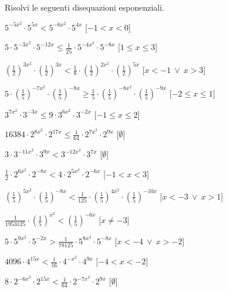 \begin{esercizio}\label{ese:}
 Risolvi le seguenti disequazioni esponenziali.
 \begin{enumeratea}
  \item  \(5^{{-5x^2}} \cdot 5^{{5x}} < 5^{{-6x^2}} \cdot 5^{{4x}}\)
   \hfill [\(-1 < x < 0\)]
  \item  \(5 \cdot 5^{{-3x^2}} \cdot 5^{{-12x}} \leqslant \frac{1}{25} \cdot 
5^{{-4x^2}} \cdot 5^{{-8x}}\)
   \hfill [\(1 \leqslant x \leqslant 3\)]
  \item  \(\left(\frac{1}{2}\right)^{{3x^2}} \cdot 
\left(\frac{1}{2}\right)^{{3x}} < \frac{1}{8} \cdot 
\left(\frac{1}{2}\right)^{{2x^2}} \cdot \left(\frac{1}{2}\right)^{{5x}}\)
   \hfill [\(x < -1~\vee~x > 3\)]
  \item  \(5 \cdot \left(\frac{1}{5}\right)^{{-7x^2}} \cdot 
\left(\frac{1}{5}\right)^{{-8x}} \geqslant \frac{1}{5} \cdot 
\left(\frac{1}{5}\right)^{{-8x^2}} \cdot \left(\frac{1}{5}\right)^{{-9x}}\)
   \hfill [\(-2 \leqslant x \leqslant 1\)]
  \item  \(3^{{7x^2}} \cdot 3^{{-3x}} \leqslant 9 \cdot 3^{{6x^2}} \cdot 
3^{{-2x}}\)
   \hfill [\(-1 \leqslant x \leqslant 2\)]
  \item  \(16384 \cdot 2^{{8x^2}} \cdot 2^{{17x}} \leqslant \frac{1}{64} \cdot 
2^{{7x^2}} \cdot 2^{{9x}}\)
   \hfill [\(\emptyset\)]
  \item  \(3 \cdot 3^{{-11x^2}} \cdot 3^{{9x}} < 3^{{-12x^2}} \cdot 3^{{7x}}\)
   \hfill [\(\emptyset\)]
  \item  \(\frac{1}{2} \cdot 2^{{6x^2}} \cdot 2^{{-8x}} < 4 \cdot 2^{{5x^2}} 
\cdot 2^{{-6x}}\)
   \hfill [\(-1 < x < 3\)]
  \item  \(\left(\frac{1}{5}\right)^{{5x^2}} \cdot 
\left(\frac{1}{5}\right)^{{-8x}} < \frac{1}{125} \cdot 
\left(\frac{1}{5}\right)^{{4x^2}} \cdot \left(\frac{1}{5}\right)^{{-10x}}\)
   \hfill [\(x < -3~\vee~x > 1\)]
  \item  \(\frac{1}{1953125} \cdot \left(\frac{1}{5}\right)^{{x^2}} < 
\left(\frac{1}{5}\right)^{{-6x}}\)
   \hfill [\(x \neq -3\)]
  \item  \(5 \cdot 5^{{9x^2}} \cdot 5^{{-2x}} > \frac{1}{78125} \cdot 
5^{{8x^2}} \cdot 5^{{-8x}}\)
   \hfill [\(x < -4~\vee~x > -2\)]
  \item  \(4096 \cdot 4^{{15x}} < \frac{1}{16} \cdot 4^{{-x^2}} \cdot 4^{{9x}}\)
   \hfill [\(-4 < x < -2\)]
  \item  \(8 \cdot 2^{{-6x^2}} \cdot 2^{{15x}} < \frac{1}{64} \cdot 2^{{-7x^2}} 
\cdot 2^{{9x}}\)
   \hfill [\(\emptyset\)]

\end{enumeratea}
\end{esercizio}
